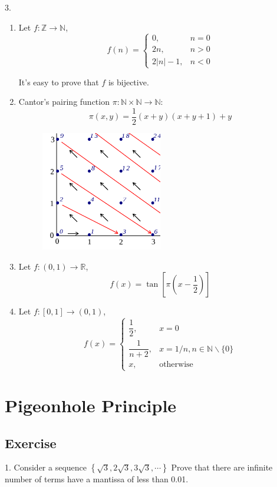 \documentclass[12pt]{article}
\begin{document}
	3. \begin{enumerate}
		\item Let $f: \mathbb{Z} \rightarrow \mathbb{N}$,
		$$
		f(n)= \begin{cases}0, & n=0 \\ 2 n, & n>0 \\ 2|n|-1, & n<0\end{cases}
		$$
		\par It's easy to prove that $f$ is bijective.
		\item Cantor's pairing function $\pi: \mathbb{N} \times \mathbb{N} \rightarrow \mathbb{N}$:
		$$\pi(x,y) = \frac{1}{2}\left(x+y\right)\left(x+y+1\right)+y$$
		\begin{figure}[h!]
			\centering
			\includegraphics[width=0.5\textwidth]{Cantor.png}
			\label{fig:cantor}
		\end{figure}
		\item Let $f: (0,1) \rightarrow \mathbb{R}$,
		$$
		f(x)= \tan \left[ \pi \left( x-\dfrac{1}{2} \right) \right] 
		$$
		\item Let $f: [0,1] \rightarrow (0,1)$,
		$$
		f(x)= \begin{cases}\dfrac{1}{2}, & x=0 \\\dfrac{1}{n+2}, & x=1 / n, n \in \mathbb{N}\backslash \! \{0\} \\ x, & \text {otherwise}\end{cases}
		$$
	\end{enumerate}

\section{Pigeonhole Principle}
\subsection{Exercise}
	1. Consider a sequence $\left\lbrace \sqrt{3}, 2\sqrt{3}, 3\sqrt{3}, \cdots \right\rbrace$ Prove that there are infinite number of terms have a mantissa of less than 0.01.
\end{document}
